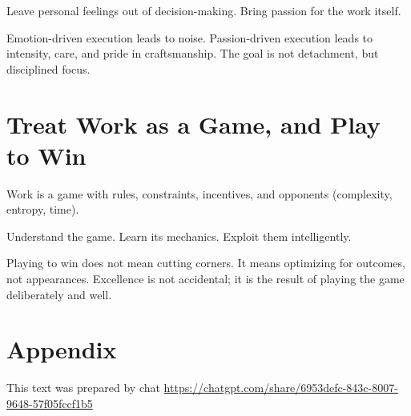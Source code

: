 Leave personal feelings out of decision-making. Bring passion for the
work itself.

Emotion-driven execution leads to noise. Passion-driven execution leads
to intensity, care, and pride in craftsmanship. The goal is not
detachment, but disciplined focus.

\section{Treat Work as a Game, and Play to
Win}\label{treat-work-as-a-game-and-play-to-win}

Work is a game with rules, constraints, incentives, and opponents
(complexity, entropy, time).

Understand the game. Learn its mechanics. Exploit them intelligently.

Playing to win does not mean cutting corners. It means optimizing for
outcomes, not appearances. Excellence is not accidental; it is the
result of playing the game deliberately and well.

\section{Appendix}\label{appendix}

This text was prepared by chat
\url{https://chatgpt.com/share/6953defc-843c-8007-9648-57f05fccf1b5}
